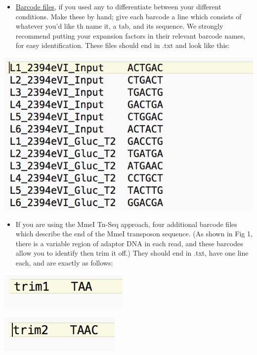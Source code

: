 \documentclass{article}
\begin{document}
\begin{itemize}

\item \href{http://hannonlab.cshl.edu/fastx_toolkit/commandline.html#fastx_barcode_splitter_usage}{Barcode files}, if you used any to differentiate between your different conditions. Make these by hand; give each barcode a line which consists of whatever you'd like th name it, a tab, and its sequence. We strongly recommend putting your expansion factors in their relevant barcode names, for easy identification. These files should end in .txt and look like this:

\end{itemize}

\includegraphics[scale=0.5]{barcode.png}

\begin{itemize}

\item If you are using the MmeI Tn-Seq approach, four additional barcode files which describe the end of the MmeI transposon sequence. (As shown in Fig 1, there is a variable region of adaptor DNA in each read, and these barcodes allow you to identify then trim it off.) They should end in .txt, have one line each, and are exactly as follows:

\end{itemize}

\includegraphics[scale=0.5]{transbc1.png}

\includegraphics[scale=0.5]{transbc2.png}
\end{document}
